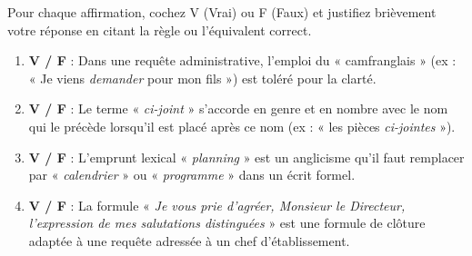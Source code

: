 \documentclass[11pt]{article}
\begin{document}
\begin{exercice}
Pour chaque affirmation, cochez V (Vrai) ou F (Faux) et justifiez brièvement votre réponse en citant la règle ou l'équivalent correct.
\begin{enumerate}
    \item \textbf{V / F} : Dans une requête administrative, l'emploi du « camfranglais » (ex : « Je viens \emph{demander} pour mon fils ») est toléré pour la clarté.
    \item \textbf{V / F} : Le terme « \emph{ci-joint} » s'accorde en genre et en nombre avec le nom qui le précède lorsqu'il est placé après ce nom (ex : « les pièces \emph{ci-jointes} »).
    \item \textbf{V / F} : L'emprunt lexical « \emph{planning} » est un anglicisme qu'il faut remplacer par « \emph{calendrier} » ou « \emph{programme} » dans un écrit formel.
    \item \textbf{V / F} : La formule « \emph{Je vous prie d'agréer, Monsieur le Directeur, l'expression de mes salutations distinguées} » est une formule de clôture adaptée à une requête adressée à un chef d'établissement.
\end{enumerate}
\end{exercice}
\end{document}
